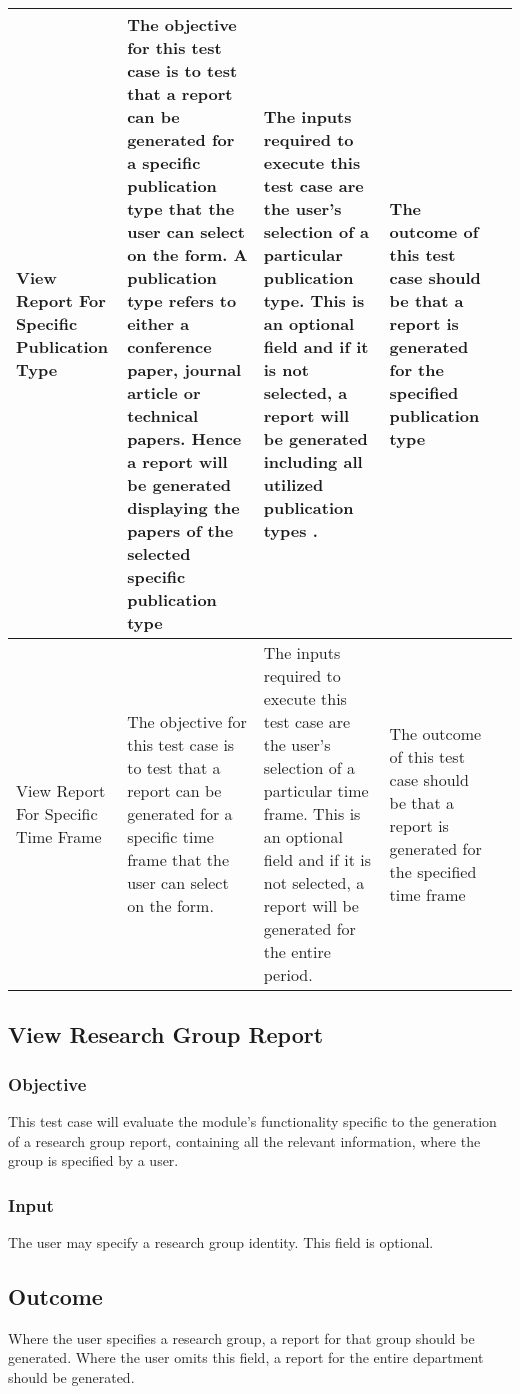 \begin{tabular}{ L{3cm}| L{3cm}| L{3cm}| L{3cm}| L{0cm}} 
\hline 
View Report For Specific Publication Type &  
The objective for this test case is to test that a report can be generated for a specific publication type that the user can select on the form. A publication type refers to either a conference paper, journal article or technical papers. Hence a report will be generated displaying the papers of the selected specific publication type & 
	The inputs required to execute this test case are the user's selection of a particular publication type. This is an optional field and if it is not selected, a report will be generated including all utilized publication types . & 
	The outcome of this test case should be that a report is generated for the specified publication type& \\ 
\hline 
View Report For Specific Time Frame &  
The objective for this test case is to test that a report can be generated for a specific time frame that the user can select on the form. & 
	The inputs required to execute this test case are the user's selection of a particular time frame. This is an optional field and if it is not selected, a report will be generated for the entire period. & 
	The outcome of this test case should be that a report is generated for the specified time frame& \\ 
\hline
	 
\end{tabular}

\subsection{View Research Group Report}
\subsubsection{Objective}
This test case will evaluate the module's functionality specific to the generation of a research group report, containing all the relevant information, where the group is specified by a user.

\subsubsection{Input}
The user may specify a research group identity. This field is optional.

\subsection{Outcome}
Where the user specifies a research group,  a report for that group should be generated. 
Where the user omits this field, a report for the entire department should be generated.

